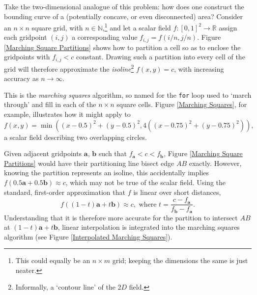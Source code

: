 \documentclass[a4paper, 11pt]{article}
\begin{document}
\begin{flushleft}
Take the two-dimensional analogue of this problem: how does one construct the bounding curve of a (potentially concave, or even disconnected) area? Consider an $n \times n$ square grid, with $n \in \mathbb{N}$,\footnote{This could equally be an $n \times m$ grid; keeping the dimensions the same is just neater.} and let a scalar field $f : [0,1]^2 \rightarrow \mathbb{R}$ assign each gridpoint $(i,j)$ a corresponding value $f_{i,j} = f(i/n,j/n)$. Figure \ref{Marching Square Partitions} shows how to partition a cell so as to enclose the gridpoints with $f_{i,j} < c$ constant. Drawing such a partition into every cell of the grid will therefore approximate the \textit{isoline}\footnote{Informally, a `contour line' of the $2D$ field.} $f(x,y) = c$, with increasing accuracy as $n \rightarrow \infty$.%



\vspace{5pt}\noindent
This is the \textit{marching squares} algorithm, so named for the \texttt{for} loop used to `march through' and fill in each of the $n \times n$ square cells. Figure \ref{Marching Squares}, for example, illustrates how it might apply to 
$$f(x,y) = \min\left(\left(x-0.5\right)^2+\left(y-0.5\right)^2,4\left(\left(x-0.75\right)^2+\left(y-0.75\right)^2\right)\right),$$
a scalar field describing two overlapping circles.


\vspace{5pt}\noindent
Given adjacent gridpoints $\mathbf{a}$, $\mathbf{b}$ such that $f_{\mathbf{a}} < c < f_{\mathbf{b}}$, Figure \ref{Marching Square Partitions} would have their partitioning line bisect edge $AB$ exactly. However, knowing the partition represents an isoline, this accidentally implies $f\left(0.5\mathbf{a} + 0.5\mathbf{b}\right) \approx c$, which may not be true of the scalar field. Using the standard, first-order approximation that $f$ is linear over short distances, 
$$f\left((1-t)\mathbf{a} + t\mathbf{b}\right) \approx c, \,\, \textrm{where} \,\, t = \frac{c-f_{\mathbf{a}}}{f_{\mathbf{b}}-f_{\mathbf{a}}}.$$
Understanding that it is therefore more accurate for the partition to intersect $AB$ at $(1-t)\mathbf{a} + t\mathbf{b}$, linear interpolation is integrated into the marching squares algorithm (see Figure \ref{Interpolated Marching Squares}).


\end{flushleft}
\end{document}
